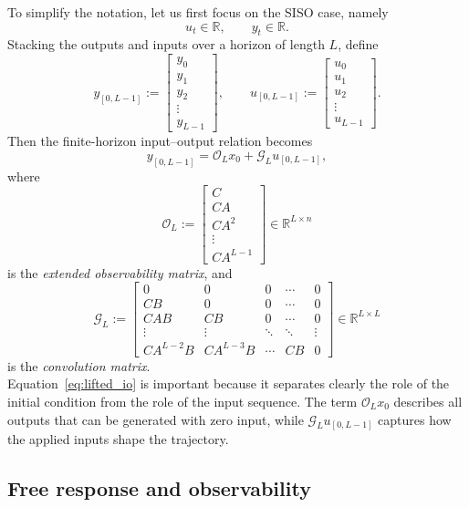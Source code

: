 To simplify the notation, let us first focus on the SISO case, namely
\[
u_t \in \mathbb{R}, \qquad y_t \in \mathbb{R}.
\]
Stacking the outputs and inputs over a horizon of length $L$, define
\[
y_{[0,L-1]} :=
\begin{bmatrix}
y_0\\
y_1\\
y_2\\
\vdots\\
y_{L-1}
\end{bmatrix},
\qquad
u_{[0,L-1]} :=
\begin{bmatrix}
u_0\\
u_1\\
u_2\\
\vdots\\
u_{L-1}
\end{bmatrix}.
\]
Then the finite-horizon input--output relation becomes
\begin{equation}
\label{eq:lifted_io}
y_{[0,L-1]} = \mathcal{O}_L x_0 + \mathcal{G}_L u_{[0,L-1]},
\end{equation}
where
$$
\mathcal{O}_L :=
\begin{bmatrix}
C\\
CA\\
CA^2\\
\vdots\\
CA^{L-1}
\end{bmatrix}
\in \mathbb{R}^{L \times n}
$$
is the \emph{extended observability matrix}, and
$$
\mathcal{G}_L :=
\begin{bmatrix}
0 & 0 & 0 & \cdots & 0\\
CB & 0 & 0 & \cdots & 0\\
CAB & CB & 0 & \cdots & 0\\
\vdots & \vdots & \ddots & \ddots & \vdots\\
CA^{L-2}B & CA^{L-3}B & \cdots & CB & 0
\end{bmatrix}
\in \mathbb{R}^{L \times L}
$$
is the \emph{convolution matrix}.\\
Equation~\eqref{eq:lifted_io} is important because it separates clearly the role of the initial condition from the role of the input sequence. The term $\mathcal{O}_L x_0$ describes all outputs that can be generated with zero input, while $\mathcal{G}_L u_{[0,L-1]}$ captures how the applied inputs shape the trajectory.

\subsection{Free response and observability}

